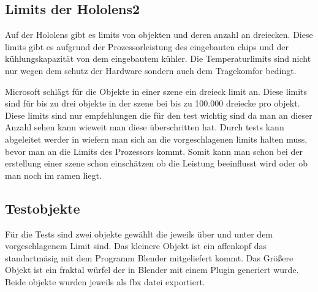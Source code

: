 
\subsection{Limits der Hololens2}\label{subsec:Limits der Hololens2}

Auf der Hololens gibt es limits von objekten und deren anzahl an dreiecken.
Diese limits gibt es aufgrund der Prozessorleistung des eingebauten chips und der kühlungskapazität von dem eingebautem kühler.
Die Temperaturlimits sind nicht nur wegen dem schutz der Hardware sondern auch dem Tragekomfor bedingt. 

Microsoft schlägt für die Objekte in einer szene ein dreieck limit an. Diese limits sind für bis zu drei 
objekte in der szene bei bis zu 100.000\autocite{optimize_3d} dreiecke pro objekt. 
Diese limits sind nur empfehlungen die für den test wichtig sind da man an dieser Anzahl 
sehen kann wieweit man diese überschritten hat.
Durch tests kann abgeleitet werder in wiefern man sich an die vorgeschlagenen limits halten muss, bevor man 
an die Limits des Prozessors kommt. Somit kann man schon bei der erstellung einer szene schon einschätzen ob
die Leistung beeinflusst wird oder ob man noch im ramen liegt.



\subsection{Testobjekte}\label{subsec:Testobjekte}


Für die Tests sind zwei objekte gewählt die jeweils über und unter dem vorgeschlagenem Limit \autocite{optimize_3d} sind.
Das kleinere Objekt ist ein affenkopf das standartmäsig mit dem Programm Blender mitgeliefert kommt.
Das Größere Objekt ist ein fraktal würfel der in Blender mit einem Plugin generiert wurde.
Beide objekte wurden jeweils als fbx datei exportiert.



